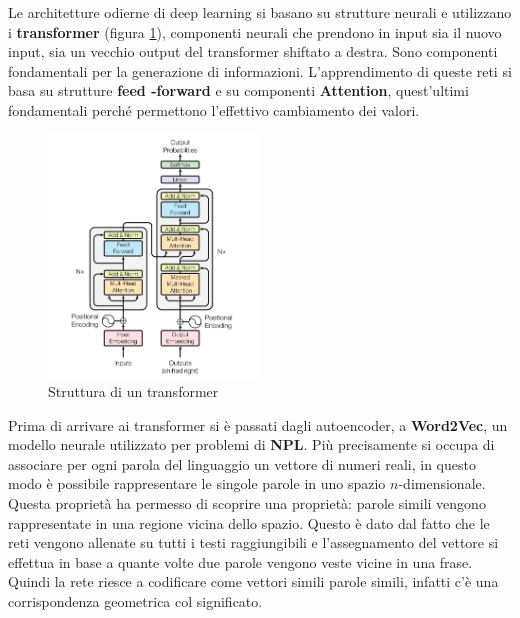 Le architetture odierne di deep learning si basano su strutture neurali e
utilizzano i \textbf{transformer} (figura \ref{fig:transformer}), componenti
neurali che prendono in input sia il nuovo input, sia un vecchio output del
transformer shiftato a destra. Sono componenti fondamentali per la generazione
di informazioni. L'apprendimento di queste reti si basa su strutture \textbf{feed
      -forward} e su componenti \textbf{Attention}, quest'ultimi fondamentali
perché permettono l'effettivo cambiamento dei valori.
\begin{figure}[!ht]
      \centering
      \includegraphics[width=0.5\textwidth]{img/deepl/transformer.png}
      \caption{Struttura di un transformer}
      \label{fig:transformer}
\end{figure}
Prima di arrivare ai transformer si è passati dagli autoencoder, a
\textbf{Word2Vec}, un modello neurale utilizzato per problemi di \textbf{NPL}.
Più precisamente si occupa di associare per ogni parola del linguaggio un vettore
di numeri reali, in questo modo è possibile rappresentare le singole parole in
uno spazio $n$-dimensionale. Questa proprietà ha permesso di scoprire una
proprietà: parole simili vengono rappresentate in una regione vicina dello
spazio. Questo è dato dal fatto che le reti vengono allenate su tutti i testi
raggiungibili e l'assegnamento del vettore si effettua in base a quante volte
due parole vengono veste vicine in una frase. Quindi la rete riesce a codificare
come vettori simili parole simili, infatti c'è una corrispondenza geometrica col
significato.

